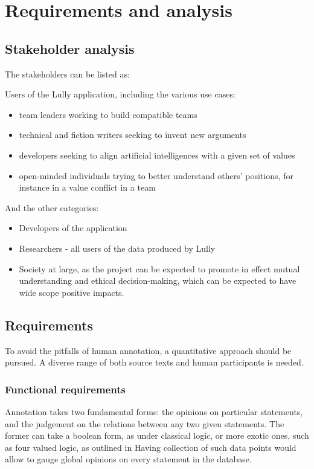 \documentclass{report}
\begin{document}
{\chapter{Requirements and analysis}

\section{Stakeholder analysis}
The stakeholders can be listed as:

Users of the Lully application, including the various use cases:
\begin{itemize}
  \item team leaders working to build compatible teams
  \item technical and fiction writers seeking to invent new arguments
  \item developers seeking to align artificial intelligences with a given set of values 
  \item open-minded individuals trying to better understand others' positions, for instance in a value conflict in a team
\end{itemize}

And the other categories:
\begin{itemize}
  \item Developers of the application 
  \item Researchers - all users of the data produced by Lully
  \item Society at large, as the project can be expected to promote in effect mutual understanding and ethical decision-making, which can be expected to have wide scope positive impacts.
\end{itemize}

\section{Requirements}
To avoid the pitfalls of human annotation, a quantitative approach should be pursued. A diverse range of both source texts and human participants is needed. 

\subsection{Functional requirements}

Annotation takes two fundamental forms: the opinions on particular statements, and the judgement on the relations between any two given statements.
The former can  take a boolean form, as under classical logic, or more exotic ones, such as four valued logic, as outlined in  \cite{priest_many-valued_2008}
Having collection of such data points would allow to gauge global opinions on every statement in the database.

}
\end{document}
